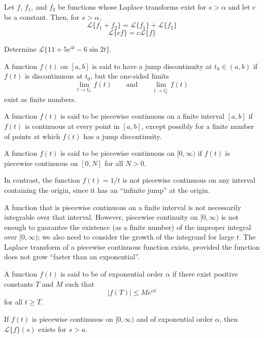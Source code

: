 \documentclass[../diffeq.tex]{subfiles}
\begin{document}
\begin{theorem}
    Let $f$, $f_1$, and $f_2$ be functions whose Laplace transforms exist for $s>\alpha$ and let $c$ be a constant. Then, for $s>\alpha$, 
    \[ \mathcal{L}\{f_1+f_2\} = \mathcal{L}\{f_1\} + \mathcal{L}\{f_2\} \]
    \[ \mathcal{L}\{cf\}=c\mathcal{L}\{f\} \]
\end{theorem}

\ex Determine $\mathcal{L}\{11+5e^{4t}-6\sin 2t\}$.

A function $f(t)$ on $[a,b]$ is said to have a jump discontinuity at $t_0\in (a,b)$ if $f(t)$ is discontinuous at $t_0$, but the one-sided limits 
\[ \lim_{t\to t_0^-}f(t) \qquad \text{and} \qquad \lim_{t\to t_0^+}f(t) \]
exist as finite numbers.

\begin{definition}
    A function $f(t)$ is said to be piecewise continuous on a finite interval $[a,b]$ if $f(t)$ is continuous at every point in $[a,b]$, except possibly for a finite number of points at which $f(t)$ has a jump discontinuity.

    A function $f(t)$ is said to be piecewise continuous on $[0,\infty)$ if $f(t)$ is piecewise continuous on $[0,N]$ for all $N>0$.
\end{definition}

In contrast, the function $f(t)=1/t$ is not piecewise continuous on any interval containing the origin, since it has an ``infinite jump'' at the origin.

A function that is piecewise continuous on a finite interval is not necessarily integrable over that interval. However, piecewise continuity on $[0,\infty)$ is not enough to guarantee the existence (as a finite number) of the improper integral over 
$[0,\infty)$; we also need to consider the growth of the integrand for large $t$. The Laplace transform of a piecewise continuous function exists, provided the function does not grow ``faster than an exponential''.

\begin{definition}
    A function $f(t)$ is said to be of exponential order $\alpha$ if there exist positive constants $T$ and $M$ such that 
    \[ |f(T)|\leq Me^{\alpha t} \]
    for all $t\geq T$.
\end{definition}

\begin{theorem}
    If $f(t)$ is piecewise continuous on $[0,\infty)$ and of exponential order $\alpha$, then $\mathcal{L}\{f\}(s)$ exists for $s>a$.
\end{theorem}
\end{document}
